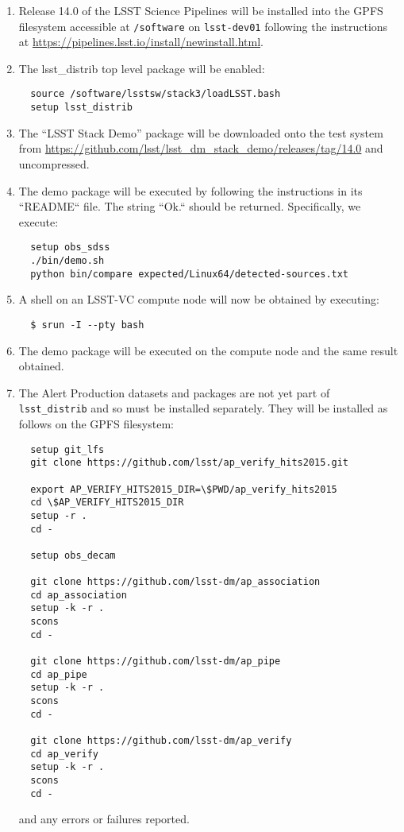 \begin{enumerate}

  \item{Release 14.0 of the LSST Science Pipelines will be installed into the
  GPFS filesystem accessible at \texttt{/software} on \texttt{lsst-dev01}
  following the instructions at
  \url{https://pipelines.lsst.io/install/newinstall.html}.}

  \item{The lsst\_distrib top level package will be enabled:

  \begin{verbatim}
  source /software/lsstsw/stack3/loadLSST.bash
  setup lsst_distrib
  \end{verbatim}
  }

  \item{The ``LSST Stack Demo'' package will be downloaded onto the test
  system from
  \url{https://github.com/lsst/lsst_dm_stack_demo/releases/tag/14.0} and
  uncompressed.}

  \item{The demo package will be executed by following the instructions in its
  ``README`` file. The string ``Ok.`` should be returned.  
  Specifically, we execute:
  \begin{verbatim}
  setup obs_sdss
  ./bin/demo.sh
  python bin/compare expected/Linux64/detected-sources.txt
  \end{verbatim}
  }

  \item{A shell on an LSST-VC compute node will now be obtained by executing:

  \begin{verbatim}
  $ srun -I --pty bash
  \end{verbatim}
  }

  \item{The demo package will be executed on the compute node and the same
  result obtained.}

  \item{The Alert Production datasets and packages are not yet part of \texttt{lsst\_distrib} and so must be installed separately.   They will be installed as follows on the GPFS filesystem:

  \begin{verbatim}
  setup git_lfs
  git clone https://github.com/lsst/ap_verify_hits2015.git

  export AP_VERIFY_HITS2015_DIR=\$PWD/ap_verify_hits2015
  cd \$AP_VERIFY_HITS2015_DIR
  setup -r .
  cd -

  setup obs_decam

  git clone https://github.com/lsst-dm/ap_association
  cd ap_association
  setup -k -r .
  scons 
  cd - 

  git clone https://github.com/lsst-dm/ap_pipe
  cd ap_pipe
  setup -k -r .
  scons 
  cd - 

  git clone https://github.com/lsst-dm/ap_verify
  cd ap_verify
  setup -k -r .
  scons 
  cd - 
  \end{verbatim}

  and any errors or failures reported.}

\end{enumerate}
